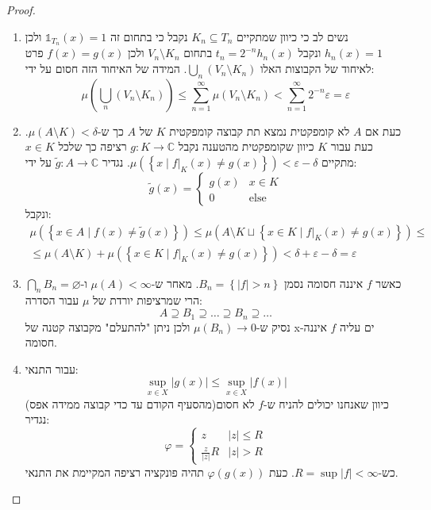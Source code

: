 \documentclass{tstextbook}
\begin{document}
\begin{proof}
\begin{enumerate}
    \item נשים לב כי כיוון שמתקיים \(K_{n}\subseteq T_{n}\) נקבל כי בתחום זה \(\mathbb{1}_{T_{n}}(x)=1\) ולכן \(h_{n}(x)=1\) ונקבל \(t_{n}=2^{-n}h_{n}(x)\) בתחום \(V_{n}\setminus K_{n}\) ולכן \(f(x)=g(x)\) פרט לאיחוד של הקבוצות האלו \(\bigcup_{n}\left( V_{n}\setminus K_{n} \right)\). המידה של האיחוד הזה חסום על ידי: 
$$\mu \left( \bigcup_{n}\left( V_{n}\setminus K_{n} \right) \right)\leq\sum_{n=1}^{\infty}\mu\left( V_{n}\setminus K_{n} \right)<\sum_{n=1}^{\infty}2^{-n}\varepsilon=\varepsilon$$


    \item כעת אם \(A\) לא קומפקטית נמצא תת קבוצה קומפקטית \(K\) של \(A\) כך ש-\(\mu\left( A\setminus K \right)<\delta\). כעת עבור \(K\) כיוון שקומפקטית מהטענה נקבל \(g:K\to \mathbb{C}\) רציפה כך שלכל \(x \in K\) מתקיים \(\mu\left( \left\{  x\mid f|_{K}(x)\neq g(x)  \right\} \right)<\varepsilon-\delta\). נגדיר \(\tilde{g}:A\to \mathbb{C}\) על ידי: 
$$\tilde{g}(x)=\begin{cases}g(x) &  x \in K \\0  & \text{else}
\end{cases}$$
ונקבל:
$$\begin{gather}\mu\left( \left\{  x \in A\mid f(x)\neq \tilde{g}(x)  \right\} \right)\leq\mu\left( A\setminus  K \sqcup \left\{  x \in K\mid f|_{K}(x)\neq g(x)  \right\} \right)\leq\\ \leq \mu\left( A\setminus  K \right)+\mu\left( \left\{  x \in K\mid f|_{K}(x)\neq g(x)  \right\} \right)< \delta+\varepsilon-\delta=\varepsilon 
\end{gather}$$


    \item כאשר \(f\) איננה חסומה נסמן \(B_{n}=\left\{  \lvert f \rvert>n  \right\}\). מאחר ש-\(\mu(A)< \infty\) ו-\(\bigcap_{n}B_{n}=\varnothing\) הרי שמרציפות יורדת של \(\mu\) עבור הסדרה: 
$$A \supseteq B_{1} \supseteq \dots \supseteq B_{n}\supseteq \dots$$
נסיק ש-\(\mu(B_{n})\to 0\) ולכן ניתן "להתעלם" מקבוצה קטנה של x-ים עליה \(f\) איננה חסומה.


    \item עבור התנאי: 
$$\sup _{x \in X}\lvert g(x) \rvert \leq \sup _{x \in X} \lvert f(x) \rvert $$
כיוון שאנחנו יכולים להניח ש-\(f\) לא חסום(מהסעיף הקודם עד כדי קבוצה ממידה אפס) נגדיר:
$$\varphi = \begin{cases} z  &   \lvert z \rvert\leq R \\\frac{z}{\lvert z \rvert }R & \lvert z \rvert > R 
\end{cases}$$
כש-\(R=\sup\lvert f \rvert<\infty\). כעת \(\varphi(g(x))\) תהיה פונקציה רציפה המקיימת את התנאי.


  \end{enumerate}
\end{proof}
\end{document}
